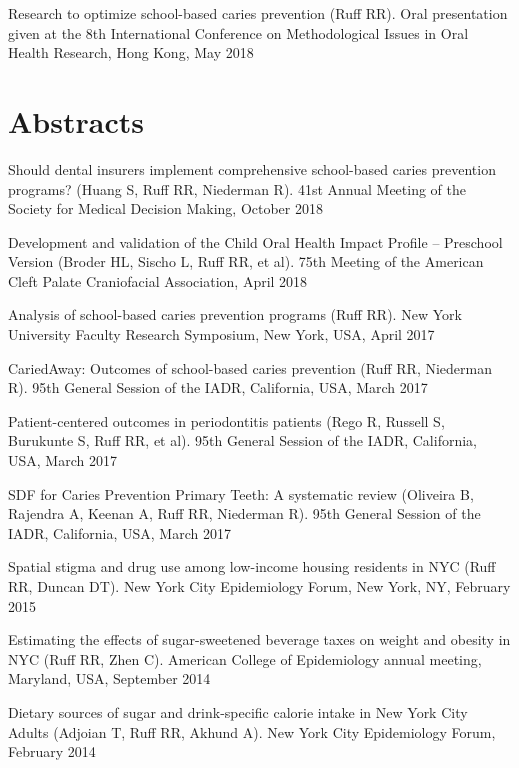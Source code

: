 \documentclass[margin,line]{res}
\begin{document}
\begin{resume}
Research to optimize school-based caries prevention (Ruff RR). Oral presentation given at the 8th International Conference on Methodological Issues in Oral Health Research, Hong Kong, May 2018

\section{\sc Abstracts}
Should dental insurers implement comprehensive school-based caries prevention programs? (Huang S, Ruff RR, Niederman R). 41st Annual Meeting of the Society for Medical Decision Making, October 2018

Development and validation of the Child Oral Health Impact Profile – Preschool Version (Broder HL, Sischo L, Ruff RR, et al). 75th Meeting of the American Cleft Palate Craniofacial Association, April 2018

Analysis of school-based caries prevention programs (Ruff RR). New York University Faculty Research Symposium, New York, USA, April 2017

CariedAway: Outcomes of school-based caries prevention (Ruff RR, Niederman R). 95th General Session of the IADR, California, USA, March 2017

Patient-centered outcomes in periodontitis patients (Rego R, Russell S, Burukunte S, Ruff RR, et al). 95th General Session of the IADR, California, USA, March 2017

SDF for Caries Prevention Primary Teeth: A systematic review (Oliveira B, Rajendra A, Keenan A, Ruff RR, Niederman R). 95th General Session of the IADR, California, USA, March 2017

Spatial stigma and drug use among low-income housing residents in NYC (Ruff RR, Duncan DT). New York City Epidemiology Forum, New York, NY, February 2015

Estimating the effects of sugar-sweetened beverage taxes on weight and obesity in NYC (Ruff RR, Zhen C). American College of Epidemiology annual meeting, Maryland, USA, September 2014

Dietary sources of sugar and drink-specific calorie intake in New York City
Adults (Adjoian T, Ruff RR, Akhund A). New York City Epidemiology Forum, February 2014



\end{resume}
\end{document}
